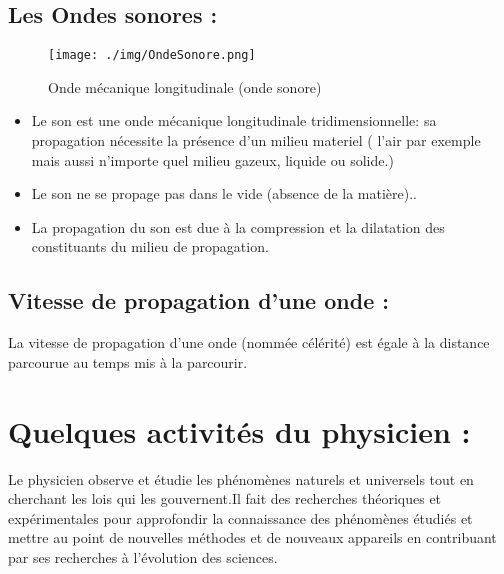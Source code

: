 \documentclass[12pt]{article}
\begin{document}
\subsection{Les Ondes sonores :}
\begin{figure}[h]
		\begin{center}
	\texttt{[image: ./img/OndeSonore.png]}
	\caption{Onde mécanique longitudinale (onde sonore)}
\end{center}
\end{figure}
\begin{itemize}
\item Le son est une onde mécanique longitudinale tridimensionnelle: sa propagation nécessite la présence d'un milieu materiel ( l'air par exemple mais aussi n'importe quel milieu gazeux, liquide ou solide.)
\item Le son ne se propage pas dans le vide (absence de la matière)..
\item La propagation du son est due à la compression et la dilatation des constituants du milieu de propagation.
\end{itemize}

\subsection{Vitesse de propagation d'une onde :}
La vitesse de propagation d'une onde (nommée célérité) est égale à la distance parcourue au temps mis à la parcourir.













\section{ Quelques activités du physicien : }

Le physicien observe et étudie les phénomènes naturels et universels tout en cherchant les lois qui les gouvernent.Il
fait des recherches théoriques et expérimentales pour approfondir la connaissance des phénomènes étudiés et mettre
au point de nouvelles méthodes et de nouveaux appareils en contribuant par ses recherches à l'évolution des sciences.
\end{document}
